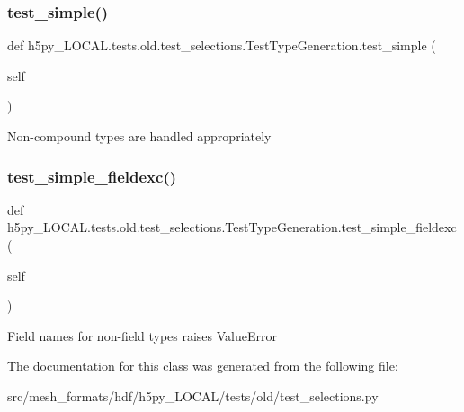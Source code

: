 \subsubsection{\texorpdfstring{test\+\_\+simple()}{test\_simple()}}
{\footnotesize\ttfamily def h5py\+\_\+\+L\+O\+C\+A\+L.\+tests.\+old.\+test\+\_\+selections.\+Test\+Type\+Generation.\+test\+\_\+simple (\begin{DoxyParamCaption}\item[{}]{self }\end{DoxyParamCaption})}

\begin{DoxyVerb}Non-compound types are handled appropriately \end{DoxyVerb}
 \mbox{\label{classh5py__LOCAL_1_1tests_1_1old_1_1test__selections_1_1TestTypeGeneration_ae508c72b7d08370c3289e2954d68a4b8}} 
\subsubsection{\texorpdfstring{test\+\_\+simple\+\_\+fieldexc()}{test\_simple\_fieldexc()}}
{\footnotesize\ttfamily def h5py\+\_\+\+L\+O\+C\+A\+L.\+tests.\+old.\+test\+\_\+selections.\+Test\+Type\+Generation.\+test\+\_\+simple\+\_\+fieldexc (\begin{DoxyParamCaption}\item[{}]{self }\end{DoxyParamCaption})}

\begin{DoxyVerb}Field names for non-field types raises ValueError \end{DoxyVerb}
 

The documentation for this class was generated from the following file\+:\begin{DoxyCompactItemize}
\item 
src/mesh\+\_\+formats/hdf/h5py\+\_\+\+L\+O\+C\+A\+L/tests/old/test\+\_\+selections.\+py\end{DoxyCompactItemize}
